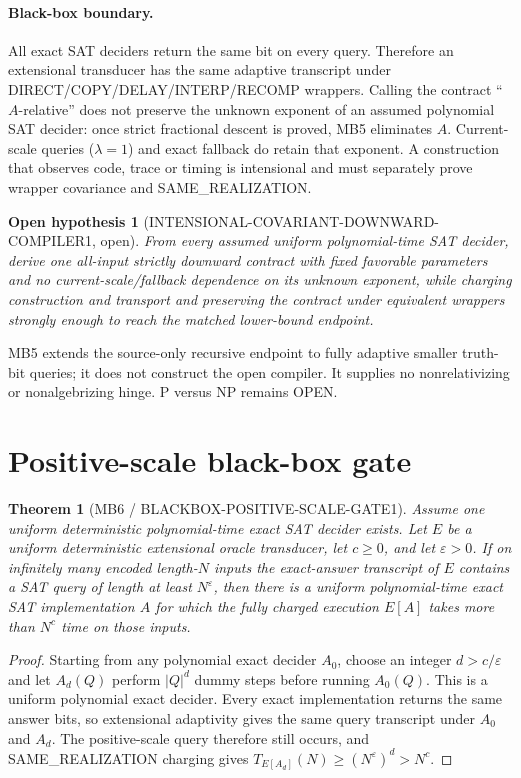 \documentclass[11pt]{article}
\newtheorem{theorem}{Theorem}
\newtheorem{hypothesis}{Open hypothesis}
\begin{document}
\paragraph{Black-box boundary.}
All exact SAT deciders return the same bit on every query. Therefore an
extensional transducer has the same adaptive transcript under
DIRECT/COPY/DELAY/INTERP/RECOMP wrappers. Calling the contract
``$A$-relative'' does not preserve the unknown exponent of an assumed
polynomial SAT decider: once strict fractional descent is proved, MB5
eliminates $A$. Current-scale queries ($\lambda=1$) and exact fallback do
retain that exponent. A construction that observes code, trace or timing is
intensional and must separately prove wrapper covariance and
SAME\_REALIZATION.

\begin{hypothesis}[INTENSIONAL-COVARIANT-DOWNWARD-COMPILER1, open]
From every assumed uniform polynomial-time SAT decider, derive one all-input
strictly downward contract with fixed favorable parameters and no
current-scale/fallback dependence on its unknown exponent, while charging
construction and transport and preserving the contract under equivalent
wrappers strongly enough to reach the matched lower-bound endpoint.
\end{hypothesis}

MB5 extends the source-only recursive endpoint to fully adaptive smaller
truth-bit queries; it does not construct the open compiler. It supplies no
nonrelativizing or nonalgebrizing hinge. P versus NP remains OPEN.

\section{Positive-scale black-box gate}

\begin{theorem}[MB6 / BLACKBOX-POSITIVE-SCALE-GATE1]
Assume one uniform deterministic polynomial-time exact SAT decider exists.
Let \(E\) be a uniform deterministic extensional oracle transducer, let
\(c\ge0\), and let \(\varepsilon>0\). If on infinitely many encoded
length-\(N\) inputs the exact-answer transcript of \(E\) contains a SAT query
of length at least \(N^\varepsilon\), then there is a uniform polynomial-time
exact SAT implementation \(A\) for which the fully charged execution
\(E[A]\) takes more than \(N^c\) time on those inputs.
\end{theorem}

\begin{proof}
Starting from any polynomial exact decider \(A_0\), choose an integer
\(d>c/\varepsilon\) and let \(A_d(Q)\) perform \(|Q|^d\) dummy steps before
running \(A_0(Q)\).  This is a uniform polynomial exact decider.  Every exact
implementation returns the same answer bits, so extensional adaptivity gives
the same query transcript under \(A_0\) and \(A_d\).  The positive-scale
query therefore still occurs, and SAME\_REALIZATION charging gives
\(T_{E[A_d]}(N)\ge(N^\varepsilon)^d>N^c\).
\end{proof}
\end{document}
